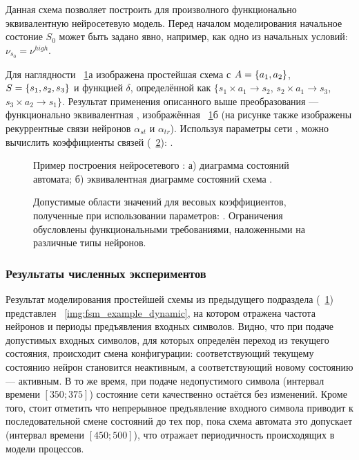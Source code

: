 Данная схема позволяет построить для произволного  функционально эквивалентную нейросетевую модель. Перед началом моделирования начальное состоние $S_{0}$ может быть задано явно, например, как одно из начальных условий: $\nu_{s_{0}} = \nu^{high}$.

Для наглядности \onfigure~\ref{img:fsm_example_topology}а изображена простейшая схема  с $A = \{ a_{1}, a_{2} \}$, $S = \{ s_{1}, s_{2}, s_{3} \}$ и функцией $\delta$, определённой как $\{ s_{1}\!\times\!a_{1} \to s_{2}$, $s_{2}\!\times\!a_{1} \to s_{3}$, $s_{3}\!\times\!a_{2} \to s_{1} \}$. Результат применения описанного выше преобразования --- функционально эквивалентная , изображённая \onfigure~\ref{img:fsm_example_topology}б (на рисунке также изображены рекуррентные связи нейронов $\alpha_{st}$ и $\alpha_{tr}$). Используя параметры сети , можно вычислить коэффициенты связей (\seefigure~\ref{img:fsm_example_weights}): .

\begin{figure}[ht]
    \caption{Пример построения нейросетевого : а) диаграмма состояний автомата; б) эквивалентная диаграмме состояний схема .} 
    \label{img:fsm_example_topology}  
\end{figure}

\begin{figure}[ht]
    \caption{Допустимые области значений для весовых коэффициентов, полученные при использовании параметров: . Ограничения обусловлены функциональными требованиями, наложенными на различные типы нейронов. } 
    \label{img:fsm_example_weights}  
\end{figure}


\subsubsection{Результаты численных экспериментов}

Результат моделирования простейшей схемы  из предыдущего подраздела (\seefigure~\ref{img:fsm_example_topology}) представлен \onfigure~\ref{img:fsm_example_dynamic}, на котором отражена частота нейронов  и периоды предъявления входных символов. Видно, что при подаче допустимых входных символов, \ie для которых определён переход из текущего состояния, происходит смена конфигурации: соответствующий текущему состоянию нейрон становится неактивным, а соответствующий новому состоянию --- активным. В то же время, при подаче недопустимого символа (интервал времени $[350; 375]$) состояние сети качественно остаётся без изменений. Кроме того, стоит отметить что непрерывное предъявление входного символа приводит к последовательной смене состояний до тех пор, пока схема автомата это допускает (интервал времени $[450; 500]$), что отражает периодичность происходящих в модели процессов.

